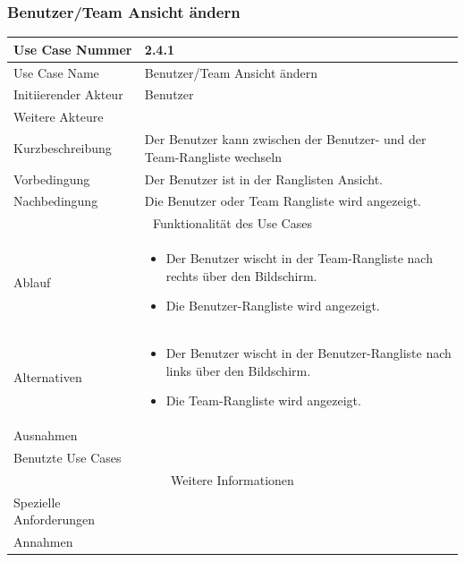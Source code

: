 \documentclass[10pt,a4paper]{article}
\begin{document}
\subsubsection{Benutzer/Team Ansicht ändern}
	\begin{tabular}{|l|p{.5\linewidth}|}
	\hline Use Case Nummer & 2.4.1 \\ 
	\hline Use Case Name & Benutzer/Team Ansicht \"andern \\ 
	\hline Initiierender Akteur & Benutzer \\
	\hline Weitere Akteure &  \\
	\hline Kurzbeschreibung & Der Benutzer kann zwischen der Benutzer- und der Team-Rangliste wechseln \\
	\hline Vorbedingung & Der Benutzer ist in der Ranglisten Ansicht. \\
	\hline Nachbedingung & Die Benutzer oder Team Rangliste wird angezeigt. \\
	\hline \multicolumn{2}{|c|}{Funktionalität des Use Cases}\\
	\hline Ablauf & \begin{itemize}
		\item Der Benutzer wischt in der Team-Rangliste nach rechts über den Bildschirm.
		\item Die Benutzer-Rangliste wird angezeigt.
	\end{itemize} \\
	\hline Alternativen & \begin{itemize}
		\item Der Benutzer wischt in der Benutzer-Rangliste nach links über den Bildschirm.
		\item Die Team-Rangliste wird angezeigt.
                \end{itemize} \\
	\hline Ausnahmen &  \\
	\hline Benutzte Use Cases &  \\
	\hline \multicolumn{2}{|c|}{Weitere Informationen} \\
	\hline Spezielle Anforderungen &  \\
	\hline Annahmen &  \\
	\hline
	\end{tabular}
\end{document}
